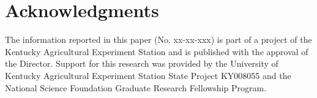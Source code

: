 \section{Acknowledgments}
\label{sec:acknowledge}

The information reported in this paper (No. xx-xx-xxx) is part of a project of the Kentucky Agricultural Experiment Station and is published with the approval of the Director.  Support for this research was provided by the University of Kentucky Agricultural Experiment Station State Project KY008055 and the National Science Foundation Graduate Research Fellowship Program.

